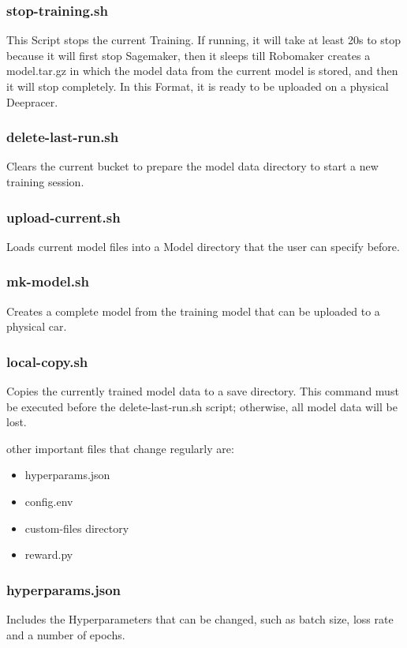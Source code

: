 \subsubsection{stop-training.sh}
This Script stops the current Training. If running, it will take at least 20s to stop because it will first stop Sagemaker, then it sleeps till Robomaker creates a model.tar.gz in which the model data from the current model is stored, and then it will stop completely. In this Format, it is ready to be uploaded on a physical Deepracer.

\subsubsection{delete-last-run.sh}
Clears the current bucket to prepare the model data directory to start a new training session.

\subsubsection{upload-current.sh}
Loads current model files into a Model directory that the user can specify before.

\subsubsection{mk-model.sh}
Creates a complete model from the training model that can be uploaded to a physical car.

\subsubsection{local-copy.sh}
Copies the currently trained model data to a save directory. This command must be executed before the delete-last-run.sh script; otherwise, all model data will be lost.

other important files that change regularly are:

\begin{itemize}
    \item hyperparams.json
    \item config.env
    \item custom-files directory
    \item reward.py
\end{itemize}

\subsubsection{hyperparams.json}
Includes the Hyperparameters that can be changed, such as batch size, loss rate and a number of epochs.


